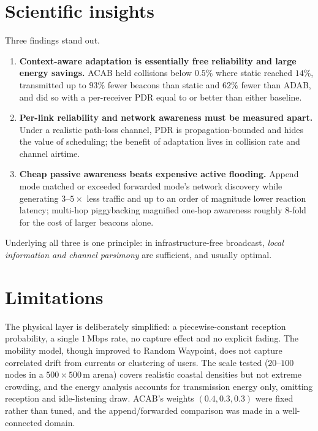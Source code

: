 \documentclass[12pt,a4paper,oneside]{report}
\begin{document}
\section{Scientific insights}
Three findings stand out.
\begin{enumerate}[leftmargin=1.4em]
  \item \textbf{Context-aware adaptation is essentially free reliability and
  large energy savings.} ACAB held collisions below $0.5\%$ where static reached
  $14\%$, transmitted up to $93\%$ fewer beacons than static and $62\%$ fewer
  than ADAB, and did so with a per-receiver PDR equal to or better than either
  baseline.
  \item \textbf{Per-link reliability and network awareness must be measured
  apart.} Under a realistic path-loss channel, PDR is propagation-bounded and
  hides the value of scheduling; the benefit of adaptation lives in collision
  rate and channel airtime.
  \item \textbf{Cheap passive awareness beats expensive active flooding.} Append
  mode matched or exceeded forwarded mode's network discovery while generating
  $3$--$5\times$ less traffic and up to an order of magnitude lower reaction latency;
  multi-hop piggybacking magnified one-hop awareness roughly $8$-fold for the
  cost of larger beacons alone.
\end{enumerate}
Underlying all three is one principle: in infrastructure-free broadcast,
\emph{local information and channel parsimony} are sufficient, and usually
optimal.

\section{Limitations}
The physical layer is deliberately simplified: a piecewise-constant reception
probability, a single $1$\,Mbps rate, no capture effect and no explicit fading.
The mobility model, though improved to Random Waypoint, does not capture
correlated drift from currents or clustering of users. The scale tested
($20$--$100$ nodes in a $500\times500$\,m arena) covers realistic coastal
densities but not extreme crowding, and the energy analysis accounts for
transmission energy only, omitting reception and idle-listening draw. ACAB's
weights $(0.4,0.3,0.3)$ were fixed rather than tuned, and the append/forwarded
comparison was made in a well-connected domain.
\end{document}
